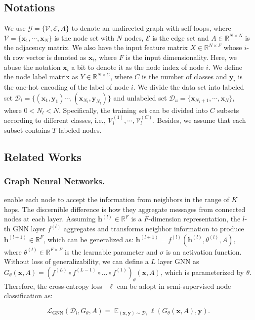\documentclass[letterpaper]{article} %
\newcommand{\labeledset}{\mathcal{D}_{l}}
\newcommand{\unlabeledset}{\mathcal{D}_{u}}
\newcommand{\aVec}[1]{\mathbf{#1}}
\DeclareMathOperator*{\expectation}{\mathbb{E}}
\begin{document}
\subsection{Notations}
We use $\mathcal{G}=\{\mathcal{V}, \mathcal{E}, A\}$ to denote an undirected graph with self-loops, where $\mathcal{V}=\{\aVec{x}_{1}, \cdots, \aVec{x}_{N}\}$ is the node set with $N$ nodes, $\mathcal{E}$ is the edge set and $A \in \mathbb{R}^{N \times N}$ is the adjacency matrix. We also have the input feature matrix $X \in \mathbb{R}^{N \times F}$ whose $i$-th row vector is denoted as $\aVec{x}_{i}$, where $F$ is the input dimensionality. Here, we abuse the notation $\aVec{x}_{i}$ a bit to denote it as the node index of node $i$. We define the node label matrix as $Y \in \mathbb{R}^{N \times C}$, where $C$ is the number of classes and $\aVec{y}_{i}$ is the one-hot encoding of the label of node $i$. We divide the data set into labeled set $\labeledset=\{(\aVec{x}_{1},\aVec{y}_{1}) \cdots, (\aVec{x}_{N_{l}}, \aVec{y}_{N_{l}})\}$ and unlabeled set $\unlabeledset=\{\aVec{x}_{N_{l}+1}, \cdots, \aVec{x}_{N}\}$, where $0 < N_{l} < N$. Specifically, the training set can be divided into $C$ subsets according to different classes, i.e., $\mathcal{V}_{l}^{(1)}, \cdots, \mathcal{V}_{l}^{(C)}$. Besides, we assume that each subset contains $T$ labeled nodes.

\subsection{Related Works}
\subsubsection{Graph Neural Networks.}
\cite{sage,gcn,gat,gin,sgc,gcnii,appnp,gprgnn} enable each node to accept the information from neighbors in the range of $K$ hops. The discernible difference is how they aggregate messages from connected nodes at each layer. Assuming $\aVec{h}^{(l)} \in \mathbb{R}^{F}$ is a $F$-dimension representation, the $l$-th GNN layer $f^{(l)}$ aggregates and transforms neighbor information to produce $\aVec{h}^{(l+1)} \in \mathbb{R}^{F}$, which can be generalized as:
$
	\aVec{h}^{(l+1)} = f^{(l)}(\aVec{h}^{(l)}, \theta^{(l)}, A),
$
where $\theta^{(l)} \in \mathbb{R}^{F \times F} $ is the learnable parameter and $\sigma$ is an activation function. Without loss of generalizability, we can define a $L$ layer GNN as $G_{\theta}(\aVec{x}, A) = (f^{(L)} \circ f^{(L-1)} \circ \dots \circ f^{(1)})_{\theta} (\aVec{x}, A)$, which is parameterized by $\theta$. Therefore, the cross-entropy loss~\cite{cross_entropy} $\ell$ can be adopt in semi-supervised node classification as:
\begin{small}
	\begin{equation}
	\label{loss-gnn}
		\mathcal{L}_{\text{GNN}} (\labeledset, G_{\theta}, A) = \expectation_{(\aVec{x}, \aVec{y}) \sim \labeledset} \ell(G_{\theta}(\aVec{x}, A), \aVec{y}).
	\end{equation}
\end{small}
\end{document}
